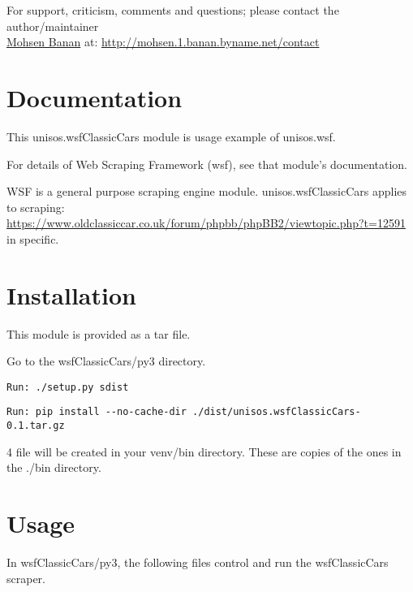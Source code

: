 \documentclass{article}
\begin{document}
For support, criticism, comments and questions; please contact the 
author/maintainer \\
\href{http://mohsen.1.banan.byname.net}{Mohsen Banan} at: \url{http://mohsen.1.banan.byname.net/contact}


\section{Documentation}

This unisos.wsfClassicCars module is usage example of unisos.wsf.

For details of Web Scraping Framework (wsf), see that module's documentation.

WSF is a general purpose scraping engine module.
unisos.wsfClassicCars applies to scraping:\\
\url{https://www.oldclassiccar.co.uk/forum/phpbb/phpBB2/viewtopic.php?t=12591}
in specific.

\section{Installation}

This module is provided as a tar file.

Go to the wsfClassicCars/py3 directory.

\begin{verbatim}
Run: ./setup.py sdist
\end{verbatim}

\begin{verbatim}
Run: pip install --no-cache-dir ./dist/unisos.wsfClassicCars-0.1.tar.gz
\end{verbatim}

4 file will be created in your venv/bin directory.
These are copies of the ones in the ./bin directory.

\section{Usage}

In wsfClassicCars/py3,
the following files control and run the wsfClassicCars scraper.
\end{document}
